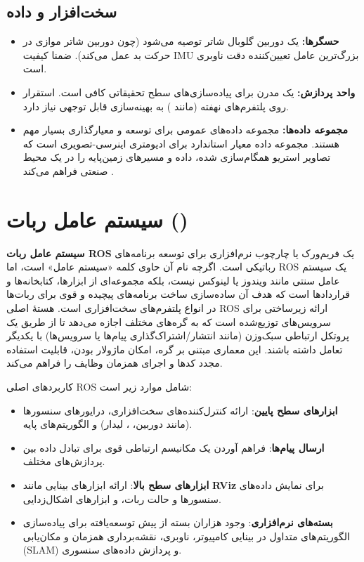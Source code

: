 \documentclass[11pt, a4paper]{article}
\begin{document}
	\subsection{سخت‌افزار و داده}
	\begin{itemize}
		\item \textbf{حسگرها:} یک دوربین گلوبال شاتر  توصیه می‌شود (چون دوربین شاتر موازی در حرکت بد عمل می‌کند). ضمنا کیفیت \gls{IMU} بزرگ‌ترین عامل تعیین‌کننده دقت ناوبری است.
		\item \textbf{واحد پردازش:} یک  مدرن برای پیاده‌سازی‌های سطح تحقیقاتی کافی است. استقرار روی پلتفرم‌های نهفته (مانند ) به بهینه‌سازی قابل توجهی نیاز دارد.
		\item \textbf{مجموعه داده‌ها:} مجموعه داده‌های عمومی برای توسعه و معیارگذاری بسیار مهم هستند. مجموعه داده \textbf{} معیار استاندارد برای ادیومتری اینرسی-تصویری است که تصاویر استریو همگام‌سازی شده، داده  و مسیرهای زمین‌پایه را در یک محیط صنعتی فراهم می‌کند  \cite{burri2016euroc}.
	\end{itemize}
	
	
	
	\section{سیستم عامل ربات
		()}
	\label{sec:ros}
	
	\textbf{سیستم عامل ربات
		\gls{ROS}
	} یک فریم‌ورک یا چارچوب نرم‌افزاری برای توسعه برنامه‌های رباتیکی است. اگرچه نام آن حاوی کلمه «سیستم عامل» است، اما 
	\gls{ROS} یک سیستم عامل سنتی مانند ویندوز یا لینوکس نیست، بلکه مجموعه‌ای از ابزارها، کتابخانه‌ها و قراردادها 
	 است که هدف آن ساده‌سازی ساخت برنامه‌های پیچیده و قوی برای ربات‌ها در انواع پلتفرم‌های سخت‌افزاری است. هستهٔ اصلی 
	\gls{ROS} ارائه زیرساختی برای سرویس‌های توزیع‌شده 
	است که به گره‌های 
	مختلف اجازه می‌دهد تا از طریق یک پروتکل ارتباطی سبک‌وزن (مانند انتشار/اشتراک‌گذاری پیام‌ها یا سرویس‌ها) با یکدیگر تعامل داشته باشند. این معماری مبتنی بر گره، امکان ماژولار بودن، قابلیت استفاده مجدد کدها و اجرای همزمان وظایف را فراهم می‌کند.
	
	کاربردهای اصلی \gls{ROS} شامل موارد زیر است:
	\begin{itemize}
		\item \textbf{ابزارهای سطح پایین}:
		ارائه کنترل‌کننده‌های سخت‌افزاری، درایورهای سنسورها (مانند دوربین، 
		، لیدار) و الگوریتم‌های پایه.
		\item \textbf{ارسال پیام‌ها}:
		فراهم آوردن یک مکانیسم ارتباطی قوی برای تبادل داده بین پردازش‌های مختلف.
		\item \textbf{ابزارهای سطح بالا}:
		ارائه ابزارهای بینایی مانند \textbf{RViz} برای نمایش داده‌های سنسورها و حالت ربات، و ابزارهای اشکال‌زدایی.
		\item \textbf{بسته‌های نرم‌افزاری}:
		وجود هزاران بسته  از پیش توسعه‌یافته برای پیاده‌سازی الگوریتم‌های متداول در بینایی کامپیوتر، ناوبری، نقشه‌برداری همزمان و مکان‌یابی (SLAM) و پردازش داده‌های سنسوری.
	\end{itemize}
	
\end{document}
